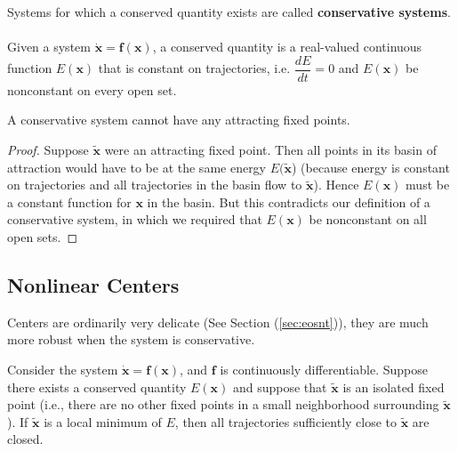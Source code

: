Systems for which a conserved quantity exists are called \textbf{conservative systems}.\\\\
Given a system $\mathbf{\dot{x}}=\mathbf{f}(\mathbf{x})$, a conserved quantity is a real-valued continuous function $E(\mathbf{x})$ that is constant on trajectories, i.e. $\dfrac{dE}{dt}=0$ and $E(\mathbf{x})$ be nonconstant on every open set.
\begin{theorem}
	A conservative system cannot have any attracting fixed points.
\end{theorem}
\begin{proof}
	Suppose $\mathbf{\tilde{x}}$ were an attracting fixed point.
	Then all points in its basin of attraction would have to be at the same energy $E(\mathbf{\tilde{x}}$) (because energy is constant on trajectories and all trajectories in the basin flow to $\mathbf{\tilde{x}}$).
	Hence $E(\mathbf{x})$ must be a constant function for $\mathbf{x}$ in the basin.
	But this contradicts our definition of a conservative system, in which we required that $E(\mathbf{x})$ be nonconstant on all open sets.
\end{proof}
\subsection*{Nonlinear Centers}
Centers are ordinarily very delicate (See Section (\ref{sec:eosnt})), they are much more robust when the system is conservative.
\begin{theorem}
	Consider the system $\mathbf{\dot{x}}=\mathbf{f}(\mathbf{x})$, and $\mathbf{f}$ is continuously differentiable.
	Suppose there exists a conserved quantity $E(\mathbf{x})$ and suppose that $\mathbf{\tilde{x}}$ is an isolated fixed point (i.e., there are no other fixed points in a small neighborhood surrounding $\mathbf{\tilde{x}}$).
	If $\mathbf{\tilde{x}}$ is a local minimum of $E$, then all trajectories sufficiently close to $\mathbf{\tilde{x}}$ are closed.
\end{theorem}